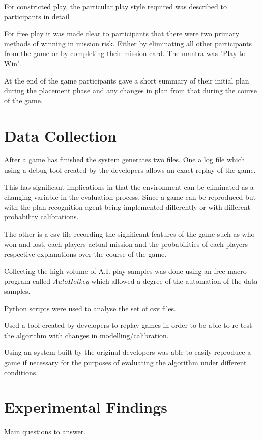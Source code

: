 \documentclass[parskip]{cs4rep}
\begin{document}
For constricted play, the particular play style required was described to participants in detail

For free play it was made clear to participants that there were two primary methods of winning in mission risk. Either by eliminating all other participants from the game or by completing their mission card. The mantra was "Play to Win".

At the end of the game participants gave a short summary of their initial plan during the placement phase and any changes in plan from that during the course of the game.

\section{Data Collection}

After a game has finished the system generates two files. One a log file which using a debug tool created by the developers allows an exact replay of the game. 

This has significant implications in that the environment can be eliminated as a changing variable in the evaluation process. Since a game can be reproduced but with the plan recognition agent being implemented differently or with different probability calibrations. 

The other is a csv file recording the significant features of the game such as who won and lost, each players actual mission and the probabilities of each players respective explanations over the course of the game.

Collecting the high volume of A.I. play samples was done using an free macro program called \textit{AutoHotkey} which allowed a degree of the automation of the data samples. 

Python scripts were used to analyse the set of csv files.

Used a tool created by developers to replay games in-order to be able to re-test the algorithm with changes in modelling/calibration.

Using an system built by the original developers was able to easily reproduce a game if necessary for the purposes of evaluating the algorithm under different conditions.

\section{Experimental Findings}

Main questions to answer.
\end{document}
